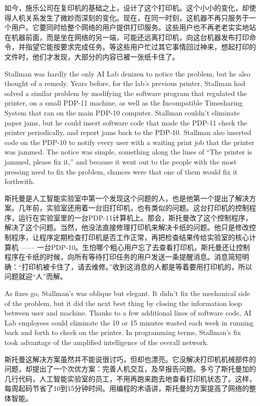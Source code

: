 \ifdefined\chs
如今，施乐公司在复印机的基础之上，设计了这个打印机。这个小小的变化，却使得人机关系发生了微妙而深刻的变化。现在，在同一时刻，这机器不再只服务于一个用户。它要同时给整个网络的用户提供打印服务。这些用户也不再老老实实地站在机器前面，而是坐在网络的另一端，可能还远离打印机，向这台机器发布打印命令，并指望它能按要求完成任务。等这些用户忙过其它事情回过神来，想起打印的文件时，他们才发现，大部分的内容已被一张纸卡住了。
\fi

\ifdefined\eng
Stallman was hardly the only AI Lab denizen to notice the problem, but he also thought of a remedy. Years before, for the lab's previous printer, Stallman had solved a similar problem by modifying the software program that regulated the printer, on a small PDP-11 machine, as well as the Incompatible Timesharing System that ran on the main PDP-10 computer. Stallman couldn't eliminate paper jams, but he could insert software code that made the PDP-11 check the printer periodically, and report jams back to the PDP-10. Stallman also inserted code on the PDP-10 to notify every user with a waiting print job that the printer was jammed. The notice was simple, something along the lines of ``The printer is jammed, please fix it,'' and because it went out to the people with the most pressing need to fix the problem, chances were that one of them would fix it forthwith.
\fi

\ifdefined\chs
斯托曼是人工智能实验室中第一个发现这个问题的人，也是他第一个提出了解决方案。几年前，实验室还用着一台旧打印机，也有类似的问题。这台打印机的控制程序，运行在实验室里的一台PDP-11计算机上。那会，斯托曼改了这个控制程序，解决了这个问题。当然，他没法直接修理打印机来解决卡纸的问题。他只是修改控制程序，让程序定期检查打印机是否工作正常，再把检查结果传给实验室的核心计算机 —— 一台PDP-10。生怕哪个粗心用户忘了去查看打印机，斯托曼还让控制程序在卡纸的时候，向所有等待打印任务的用户发送一条提醒消息。消息简短明确：“打印机被卡住了，请去维修。”收到这消息的人都是等着要用打印机的，所以问题就迎“人”而解。
\fi

\ifdefined\eng
As fixes go, Stallman's was oblique but elegant. It didn't fix the mechanical side of the problem, but it did the next best thing by closing the information loop between user and machine. Thanks to a few additional lines of software code, AI Lab employees could eliminate the 10 or 15 minutes wasted each week in running back and forth to check on the printer. In programming terms, Stallman's fix took advantage of the amplified intelligence of the overall network.
\fi

\ifdefined\chs
斯托曼这解决方案虽然并不能说很讨巧，但却也漂亮。它没解决打印机机械部件的问题，却提出了一个次优方案：完善人机交互，及早报告问题。多亏了斯托曼加的几行代码，人工智能实验室的员工，不用再跑来跑去地查看打印机状态了。这样，每周起码节省了10到15分钟时间。用编程的术语讲，斯托曼的方案提高了网络的整体智能。
\fi

